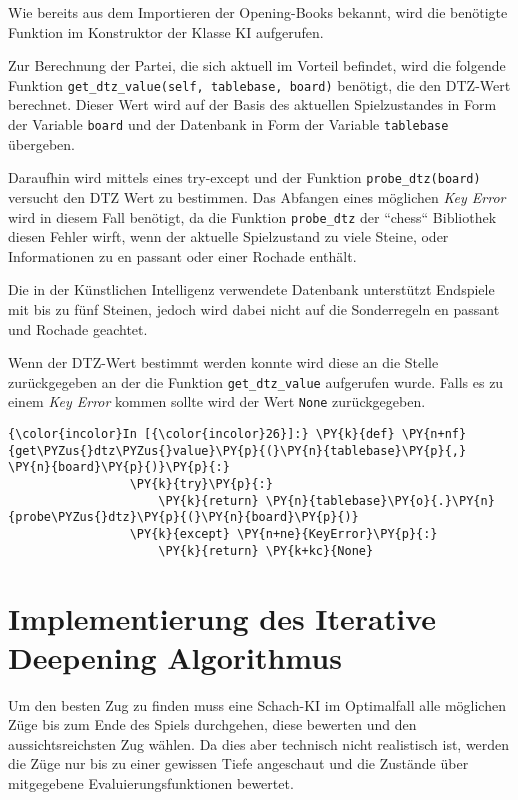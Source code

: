     Wie bereits aus dem Importieren der Opening-Books bekannt, wird die
benötigte Funktion im Konstruktor der Klasse KI aufgerufen.

    Zur Berechnung der Partei, die sich aktuell im Vorteil befindet, wird die
folgende Funktion \texttt{get\_dtz\_value(self,\ tablebase,\ board)}
benötigt, die den DTZ-Wert berechnet. Dieser Wert wird auf der Basis des
aktuellen Spielzustandes in Form der Variable \texttt{board} und der
Datenbank in Form der Variable \texttt{tablebase} übergeben.

Daraufhin wird mittels eines try-except und der Funktion
\texttt{probe\_dtz(board)} versucht den DTZ Wert zu bestimmen. Das
Abfangen eines möglichen \emph{Key Error} wird in diesem Fall benötigt,
da die Funktion \texttt{probe\_dtz} der ``chess`` Bibliothek diesen Fehler
wirft, wenn der aktuelle Spielzustand zu viele Steine, oder
Informationen zu en passant oder einer Rochade enthält.

Die in der Künstlichen Intelligenz verwendete Datenbank unterstützt
Endspiele mit bis zu fünf Steinen, jedoch wird dabei nicht auf die
Sonderregeln en passant und Rochade geachtet.

Wenn der DTZ-Wert bestimmt werden konnte wird diese an die Stelle
zurückgegeben an der die Funktion \texttt{get\_dtz\_value} aufgerufen
wurde. Falls es zu einem \emph{Key Error} kommen sollte wird der Wert
\texttt{None} zurückgegeben.

    \begin{Verbatim}[commandchars=\\\{\}]
{\color{incolor}In [{\color{incolor}26}]:} \PY{k}{def} \PY{n+nf}{get\PYZus{}dtz\PYZus{}value}\PY{p}{(}\PY{n}{tablebase}\PY{p}{,} \PY{n}{board}\PY{p}{)}\PY{p}{:}
                 \PY{k}{try}\PY{p}{:}
                     \PY{k}{return} \PY{n}{tablebase}\PY{o}{.}\PY{n}{probe\PYZus{}dtz}\PY{p}{(}\PY{n}{board}\PY{p}{)}
                 \PY{k}{except} \PY{n+ne}{KeyError}\PY{p}{:}
                     \PY{k}{return} \PY{k+kc}{None}
\end{Verbatim}

    \section{Implementierung des Iterative Deepening
Algorithmus}\label{implementierung-des-iterative-deepening-algorithmus}

Um den besten Zug zu finden muss eine Schach-KI im Optimalfall alle
möglichen Züge bis zum Ende des Spiels durchgehen, diese bewerten und
den aussichtsreichsten Zug wählen. Da dies aber technisch nicht
realistisch ist, werden die Züge nur
bis zu einer gewissen Tiefe angeschaut und die Zustände über mitgegebene
Evaluierungsfunktionen bewertet.

